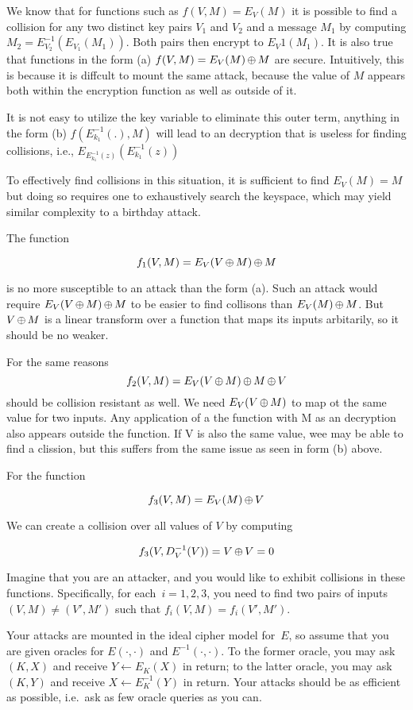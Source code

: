 \documentclass[11pt]{article}
\begin{document}
We know that for functions such as $f(V,M) = E_V(M)$ it is possible to find a collision for any two distinct key pairs $V_1$ and $V_2$ and a message $M_1$ by computing $M_2 = E^{-1}_{V_2}(E_{V_1}(M_1))$.  Both pairs then encrypt to $E_V1(M_1)$.  It is also true that functions in the form (a) $f(V,M) = E_V(M) {\,\oplus\,} M$ are secure.  Intuitively, this is because it is diffcult to mount the same attack, because the value of $M$ appears both within the encryption function as well as outside of it.

It is not easy to utilize the key variable to eliminate this outer term, anything in the form (b) $f(E^{-1}_{k_1}(.),M)$ will lead to an decryption that is useless for finding collisions, i.e., $E_{E^{-1}_{k_1}(z)}( E^{-1}_{k_1}(z) )$ 

To effectively find collisions in this situation, it is sufficient to find $E_V(M) = M$ but doing so requires one to exhaustively search the keyspace, which may yield similar complexity to a birthday attack.

The function 

\[
f_1(V,M) = E_V(V {\,\oplus\,} M) {\,\oplus\,} M 
\]

is no more susceptible to an attack than the form (a). Such an attack would require $E_V(V {\,\oplus\,} M) {\,\oplus\,} M$ to be easier to find collisons than $E_V(M) {\,\oplus\,} M$.  But $V {\,\oplus\,} M$ is a linear transform over a function that maps its inputs arbitarily, so it should be no weaker.

For the same reasons
\[
f_2(V,M) = E_V(V {\,\oplus\,} M) {\,\oplus\,} M {\,\oplus\,} V
\]
should be collision resistant as well.  We need $E_V(V {\,\oplus\,} M)$ to map ot the same value for two inputs. Any application of a the function with M as an decryption  also appears outside the function.  If V is also the same value, wee may be able to find a clission, but this suffers from the same issue as seen in form (b) above.

For the function 

\[
f_3(V,M) = E_V(M) {\,\oplus\,} V
\]

We can create a collision over all values of $V$ by computing 

\[
f_3(V,D^{-1}_V(V)) = V {\,\oplus\,} V = 0
\]

Imagine that you are an attacker, and you would like to exhibit
collisions in these functions.  Specifically, for each~$i=1,2,3$, you need
to find two pairs of inputs  $(V,M) \neq (V',M')$ such that
$f_i(V,M) = f_i(V',M')$.  

Your attacks are mounted in the ideal cipher
model for~$E$, so assume that you are given oracles for
$E(\cdot,\cdot)$ and $E^{-1}(\cdot,\cdot)$.  To the former oracle, you
may ask $(K,X)$ and receive $Y \gets E_K(X)$ in return; to the latter oracle,
you may ask $(K,Y)$ and receive $X \gets E^{-1}_K(Y)$ in return.  Your
attacks should be as efficient as possible, i.e.\ ask as few oracle
queries as you can.
\end{document}
